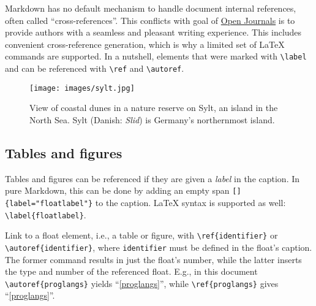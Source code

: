 \documentclass[
]{article}
\begin{document}
Markdown has no default mechanism to handle document internal
references, often called ``cross-references''. This conflicts with goal
of \href{https://theoj.org}{Open Journals} is to provide authors with a
seamless and pleasant writing experience. This includes convenient
cross-reference generation, which is why a limited set of LaTeX commands
are supported. In a nutshell, elements that were marked with
\texttt{\textbackslash{}label} and can be referenced with
\texttt{\textbackslash{}ref} and \texttt{\textbackslash{}autoref}.

\begin{figure}
\hypertarget{sylt}{%
\centering
\texttt{[image: images/sylt.jpg]}
\caption{View of coastal dunes in a nature reserve on Sylt, an island in
the North Sea. Sylt (Danish: \emph{Slid}) is Germany's northernmost
island.}\label{sylt}
}
\end{figure}

\hypertarget{tables-and-figures}{%
\subsection{Tables and figures}\label{tables-and-figures}}

Tables and figures can be referenced if they are given a \emph{label} in
the caption. In pure Markdown, this can be done by adding an empty span
\texttt{{[}{]}\{label="floatlabel"\}} to the caption. LaTeX syntax is
supported as well: \texttt{\textbackslash{}label\{floatlabel\}}.

Link to a float element, i.e., a table or figure, with
\texttt{\textbackslash{}ref\{identifier\}} or
\texttt{\textbackslash{}autoref\{identifier\}}, where
\texttt{identifier} must be defined in the float's caption. The former
command results in just the float's number, while the latter inserts the
type and number of the referenced float. E.g., in this document
\texttt{\textbackslash{}autoref\{proglangs\}} yields
``\autoref{proglangs}'', while \texttt{\textbackslash{}ref\{proglangs\}}
gives ``\ref{proglangs}''.
\end{document}
